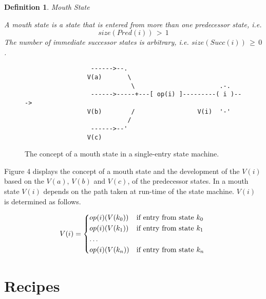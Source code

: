 \documentclass[12pt,a4paper]{scrartcl}
\newtheorem{definition}{Definition}
\begin{document}
\begin{definition}
Mouth State

A mouth state is a state that is entered from more than one predecessor 
state, i.e.
\begin{equation}
                           size(Pred(i))\,>\,1
\end{equation}
The number of immediate successor states is arbitrary, i.e.
$size(Succ(i))\,\ge\,0$.

\end{definition}
    
\begin{figure}[htbp] \leavevmode
\begin{verbatim}
                  ------>--.  
                 V(a)       \ 
                             \                       .-.
                  ------>-----+---[ op(i) ]---------( i )---> 
                 V(b)        /                 V(i)  '-'
                            /
                  ------>--'
                 V(c)

\end{verbatim}
\caption{The concept of a mouth state in a single-entry state machine.}
\end{figure}

Figure 4 displays the concept of a mouth state and the development of the
$V(i)$ based on the $V(a),\,V(b)$ and $V(c)$, of the predecessor states. In
a mouth state $V(i)$ depends on the path taken at run-time of the state machine.
$V(i)$ is determined as follows.

\begin{equation} \label{eq:interference}
    V(i) = \begin{dcases*}
            op(i)(V(k_0)) & if entry from state $k_0$ \\
            op(i)(V(k_1)) & if entry from state $k_1$ \\
            \ldots \\
            op(i)(V(k_n)) & if entry from state $k_n$ \\
            \end{dcases*}
\end{equation}


%
\section{Recipes}
\end{document}
